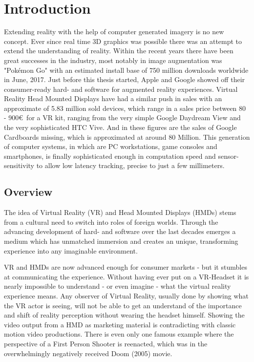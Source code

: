 %
\chapter{Introduction}
\label{sec:intro}


Extending reality with the help of computer generated imagery is no new 
concept. Ever since real time 3D graphics was possible there was an attempt to 
extend the understanding of reality. Within the recent years there have been 
great successes in the industry, most notably in image augmentation was 
"Pok\'emon Go" with an estimated install base of 750 million downloads 
worldwide in June, 2017. \cite{appannie:2017}  Just before this thesis 
started, Apple and Google showed off their consumer-ready hard- and software 
for augmented reality experiences.
\newline
Virtual Reality Head Mounted Displays have had a similar push in sales with an 
approximate of 5.83 million sold devices, which range in a sales price between 
80 - 900€ for a VR kit, ranging from the very simple Google Daydream View and 
the very sophisticated HTC Vive. \cite{erguerel:2017} And in these figures are 
the sales of Google Cardboards missing, which is approximated at around 80 
Million.
\newline
This generation of computer systems, in which are PC workstations, game 
consoles and smartphones, is finally sophisticated enough in computation speed 
and sensor-sensitivity to allow low latency tracking, precise to just a few 
millimeters.

\section{Overview}
\label{sec:intro:outline}

The idea of Virtual Reality (VR) and Head Mounted Displays (HMDs) stems from a 
cultural need to switch into roles of foreign worlds. Through the advancing 
development of hard- and software over the last decades emerges a medium which 
has unmatched immersion and creates an unique, transforming experience into any 
imaginable environment.

VR and HMDs are now advanced enough for consumer markets - but it stumbles at 
communicating the experience. Without having ever put on a VR-Headset it is 
nearly impossible to understand - or even imagine - what the virtual reality 
experience means. Any observer of Virtual Reality, usually done by showing what 
the VR actor is seeing, will not be able to get an understand of the importance 
and shift of reality perception without wearing the headset himself.
\newline
Showing the video output from a HMD as marketing material is contradicting with 
classic motion video productions. There is even only one famous example where 
the perspective of a First Person Shooter is reenacted, which was in the 
overwhelmingly negatively received Doom (2005) movie.

